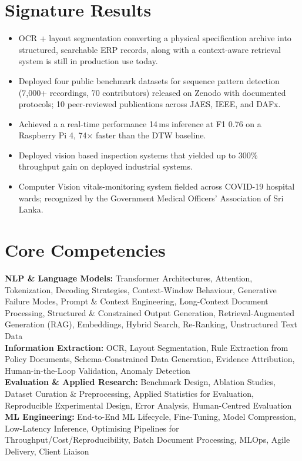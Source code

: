 \documentclass[11pt]{article}
\begin{document}
\section*{Signature Results}
\begin{itemize}[leftmargin=1.2em, itemsep=-0.3em, topsep=0em]
    \item OCR + layout segmentation converting a physical specification archive into structured, searchable ERP records, along with a context-aware retrieval system is still in production use today.
    \item Deployed four public benchmark datasets for sequence pattern detection (7,000+ recordings, 70 contributors) released on Zenodo with documented protocols; 10 peer-reviewed publications across JAES, IEEE, and DAFx.
    \item Achieved a a real-time performance 14\,ms inference at F1 0.76 on a Raspberry Pi 4, 74$\times$ faster than the DTW baseline.
    \item Deployed vision based inspection systems that yielded up to 300\% throughput gain on deployed industrial systems.
    \item Computer Vision vitals-monitoring system fielded across COVID-19 hospital wards; recognized by the Government Medical Officers' Association of Sri Lanka.
\end{itemize}

\section*{Core Competencies}

\textbf{NLP \& Language Models:} Transformer Architectures, Attention, Tokenization, Decoding Strategies, Context-Window Behaviour, Generative Failure Modes, Prompt \& Context Engineering, Long-Context Document Processing, Structured \& Constrained Output Generation, Retrieval-Augmented Generation (RAG), Embeddings, Hybrid Search, Re-Ranking, Unstructured Text Data\\
\textbf{Information Extraction:} OCR, Layout Segmentation, Rule Extraction from Policy Documents, Schema-Constrained Data Generation, Evidence Attribution, Human-in-the-Loop Validation, Anomaly Detection\\
\textbf{Evaluation \& Applied Research:} Benchmark Design, Ablation Studies, Dataset Curation \& Preprocessing, Applied Statistics for Evaluation, Reproducible Experimental Design, Error Analysis, Human-Centred Evaluation\\
\textbf{ML Engineering:} End-to-End ML Lifecycle, Fine-Tuning, Model Compression, Low-Latency Inference, Optimising Pipelines for Throughput/Cost/Reproducibility, Batch Document Processing, MLOps, Agile Delivery, Client Liaison
\end{document}
